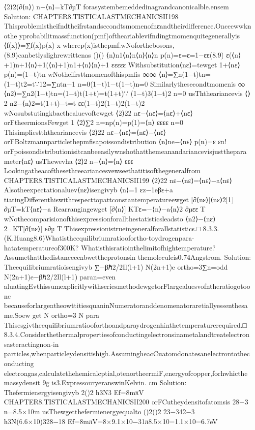 {{{{{{{{{{{⟨2⟩2(∂⟨n⟩)
n−⟨n⟩=kT∂µT
forasystembemeddedinagrandcanonicalble.ensem
Solution:
CHAPTER8.TISTICALASTMECHANICSII198
Thisproblemistheifndtheifrstandsecondtsmomenofnεandtheirdifference.Onceewwknothe
yprobabilitmassfunction(pmf)oftheariablevifndingtmomenquitegenerallyis
⟨f(x)⟩=∑f(x)p(x)
x
wherep(x)isthepmf.wNoforthebosons,(8.9)canbetlyslighrewrittenas
()()
⟨n⟩n1⟨n⟩n⟨n⟩⟨n⟩n
p(n)=ε=ε=1−εε(8.9)
ε(⟨n⟩+1)n+1⟨n⟩+1(⟨n⟩+1)n1+⟨n⟩⟨n⟩+1
εεεεε
Withsubstitution⟨nε⟩=tewget
1+⟨nε⟩
p(n)=(1−t)tn
wNotheifrsttmomenofthispmfis
∞∞
⟨n⟩=∑n(1−t)tn=(1−t)t2=t∵12=∑ntn−1
n=0(1−t)1−t(1−t)n=0
Similarlythesecondtmomenis
∞
⟨n2⟩=∑n2(1−t)tn=(1−t)t(1+t)=t(1+t)∵
(1−t)3(1−t)2
n=0
usThtheariancevis
⟨⟩2
n2−⟨n⟩2=t(1+t)−t=t
εε(1−t)2(1−t)2(1−t)2
wNosubstutingkbacthealuevoftewget
⟨2⟩22
nε−⟨nε⟩=⟨nε⟩+⟨nε⟩
orFtheermionsFewget
1
⟨2⟩∑2
n=np(n)=p(1)=⟨n⟩
εεεε
n=0
Thisimpliestththeariancevis
⟨2⟩22
nε−⟨nε⟩=⟨nε⟩−⟨nε⟩
orFBoltzmannparticlethepmfisapoissondistribution
⟨n⟩ne−⟨nε⟩
p(n)=ε
εn!
orFpoissondistributionisitcanbeeasilywnshothatthemeanandariancevisjusttheparameter⟨nε⟩
usThewevha
⟨2⟩2
n−⟨n⟩=⟨n⟩
εεε
Lookingatheacofthesethreeariancesvewseethatitisofthegeneralfrom
CHAPTER8.TISTICALASTMECHANICSII199
⟨2⟩22
nε−⟨nε⟩=⟨nε⟩−a⟨nε⟩
Alsotheexpectationaluev⟨nε⟩isengivyb
⟨n⟩=1
εz−1eβε+a
tiatingDifferenthiswithrespecttoµattconstantemperatureewget
[∂⟨nε⟩]⟨nε⟩2[1]
∂µT=kT⟨nε⟩−a
Rearrangingewget
[∂⟨n⟩]
KTε=−⟨n⟩−a⟨n⟩2
∂µεε
T
wNothecomparisionofthisexpressionforallthestatisticsleadsto
⟨n2⟩−⟨nε⟩2=KT[∂⟨nε⟩]
ε∂µ
T
Thisexpressionistrueingeneralforallstatistics.□
8.3.3.(K.Huang8.6)Whatistheequilibriumratioofortho-toydrogenpara-hatatemperatureof300K?
Whatisthisratiointhelimitofhightemperature?Assumethatthedistanceeenbwettheprotonsin
themoleculeis0.74Angstrom.
Solution:
Theequilibriumratioisengivyb
∑−βℏ2/2Il(l+1)
N(2n+1)e
ortho=3∑n=odd
N(2n+1)e−βℏ2/2Il(l+1)
paran=even
aluatingEvthissumexplicitlywithseriesmethodewgetorFlargealuesvofntheratiogotoone
becauseforlargentheowttitiesquaninNumeratoranddenomenatoraretiallyessenthesame.Soew
get
N
ortho=3
N
para
Thisesgivtheequilibriumratiooforthoandparaydrogenhinthetemperaturerequired.□
8.3.4.Considerthethermalpropertiesofconductingelectronsinametalandtreatelectronsasteractingnon-in
particles,whenparticleydensitishigh.AssumingheacCuatomdonatesanelectrontotheconducting
electrongas,calculatethehemicalcptial,otenortheermiF,energyofcopper,forhwhicthemassydensit
9g
is3.ExpressouryeranswinKelvin.
cm
Solution:
Thefermienergyisengivyb
2()2
h3N3
Ef=8mπV
CHAPTER8.TISTICALASTMECHANICSII200
orFCutheydensitofatomsis
28−3
n=8.5×10m
usThewgetthefermienergyequalto
()2()2
23−342−3
h3N(6.6×10)328−18
Ef=8mπV=8×9.1×10−31π8.5×10=1.1×10=6.7eV
}}}}}}}}}}}
